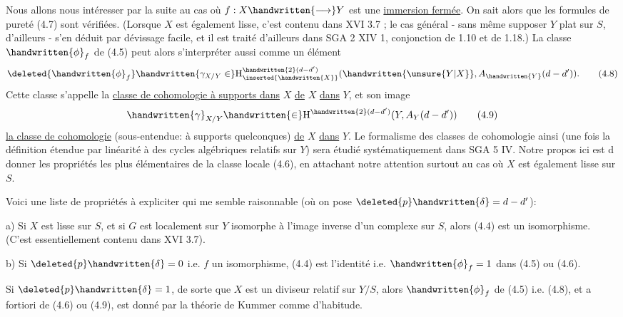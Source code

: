 Nous allons nous intéresser par la suite au cas où $f:X\handwritten{\longrightarrow}Y$ est une \uline{immersion fermée}. On sait alors que les formules de pureté (4.7)
sont vérifiées. (Lorsque $X$ est également lisse, c'est contenu dans XVI 3.7 ; le cas général - sans même supposer $Y$ plat sur $S$, d'ailleurs - s'en déduit par  dévissage facile, et il est traité d'ailleurs dans SGA 2 XIV 1, conjonction de 1.10 et de 1.18.) La classe $\handwritten{\phi}_f$ de (4.5) peut alors s'interpréter aussi comme un élément 
\[
\deleted{\handwritten{\phi}_f}\handwritten{\gamma_{X/Y}\in}\mathrm{H}^{\handwritten{2}(d-d')}_{\inserted{\handwritten{X}}}(\handwritten{\unsure{Y|X}},A_{\handwritten{Y}}(d-d')).
\tag*{(4.8)}
\]
Cette classe s'appelle la \uline{classe de cohomologie à supports dans} $X$ \uline{de} $X$ \uline{dans} $Y$, et son image
\[
\handwritten{\gamma}_{X/Y}\handwritten{\in}\mathrm{H}^{\handwritten{2}(d-d')}(Y,A_Y(d-d'))
\tag*{(4.9)}
\]
\uline{la classe de cohomologie} (sous-entendue: à supports quelconques) \uline{de} $X$ \uline{dans} $Y$. Le formalisme des classes de cohomologie ainsi   (une fois la définition étendue par linéarité à des cycles algébriques relatifs sur $Y$) sera étudié systématiquement dans SGA 5 IV. Notre propos ici est d donner  les propriétés les plus élémentaires de la classe locale (4.6), en attachant notre attention surtout au cas où $X$ est également lisse sur $S$.

Voici une liste de propriétés à expliciter qui me semble raisonnable\deleted{\unsure{;|:}} (où on pose $\deleted{p}\handwritten{\delta}=d-d'$)\deleted{;}:

 a) Si $X$ est lisse sur $S$, et si $G$ est localement sur $Y$ isomorphe à l'image inverse d'un complexe sur $S$, alors (4.4) est un isomorphisme. (C'est essentiellement contenu dans XVI 3.7).

 b) Si $\deleted{p}\handwritten{\delta}=0$ i.e. $f$ un isomorphisme, (4.4) est l'identité i.e. $\handwritten{\phi}_f=1$ dans (4.5) ou (4.6).

 Si $\deleted{p}\handwritten{\delta}=1$, de sorte que $X$ est un diviseur relatif sur $Y/S$, alors $\handwritten{\phi}_f$ de (4.5) i.e. (4.8), et a fortiori de (4.6) ou (4.9), est donné par la théorie de Kummer comme d'habitude.

